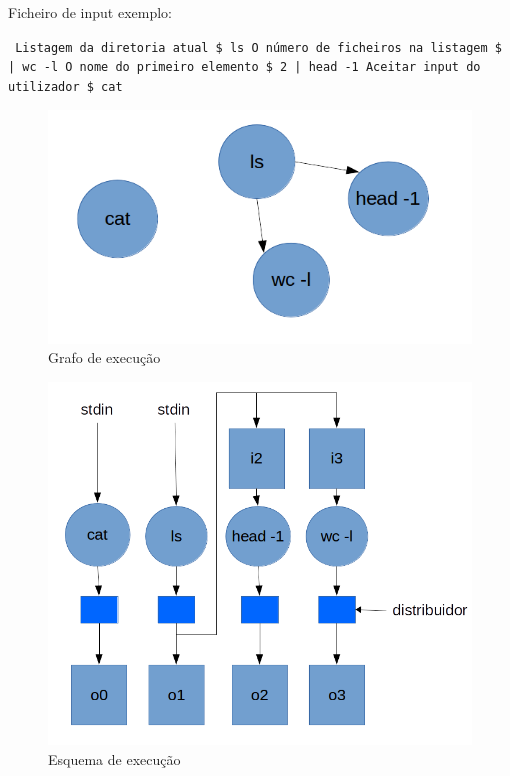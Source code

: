 \documentclass[12pt]{report}
\begin{document}
Ficheiro de input exemplo:

\texttt{
\newline
    Listagem da diretoria atual\newline
    \$ ls\newline
\newline
    O número de ficheiros na listagem\newline
    \$ | wc -l\newline
\newline
    O nome do primeiro elemento\newline
    \$ 2 | head -1\newline
\newline
    Aceitar input do utilizador\newline
    \$ cat
}

\begin{figure}
    \includegraphics[width=\linewidth]{grafo_execucao_exemplo.png}
    \caption{Grafo de execução}
    \label{fig:grafo_execucao}
\end{figure}

\begin{figure}
    \includegraphics[width=\linewidth]{esquema_execucao_exemplo.png}
    \caption{Esquema de execução}
    \label{fig:esquema_execucao}
\end{figure}
\end{document}
